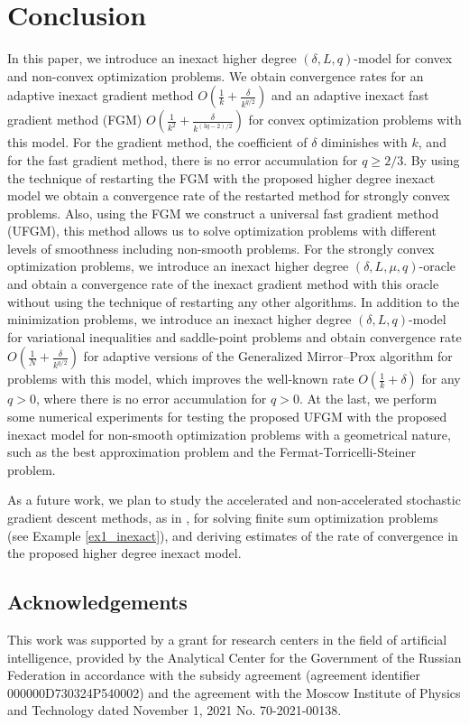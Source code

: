 \documentclass[11pt]{amsart}
\theoremstyle{definition}
\numberwithin{equation}{section}
\begin{document}
\section{Conclusion}\label{sect:Conclusion}
In this paper, we introduce an inexact higher degree $(\delta, L, q)$-model for convex and non-convex optimization problems.  We obtain convergence rates for an adaptive inexact gradient method $O\left(\frac{1}{k} + \frac{\delta}{k^{q/2}}\right)$ and an adaptive inexact fast gradient method (FGM) $O\left(\frac{1}{k^2} + \frac{\delta}{k^{(3q-2)/2}}\right)$ for convex optimization problems with this model.  For the gradient method, the coefficient of $\delta$ diminishes with $k$, and for the fast gradient method, there is no error accumulation for $q \geq 2/3$. By using the technique of restarting the FGM with the proposed higher degree inexact model we obtain a convergence rate of the restarted method for strongly convex problems. Also, using the FGM we construct a universal fast gradient method (UFGM), this method allows us to solve optimization problems with different levels of smoothness including non-smooth problems. For the strongly convex optimization problems, we introduce an inexact higher degree $(\delta, L, \mu, q)$-oracle and obtain a convergence rate of the inexact gradient method with this oracle without using the technique of restarting any other algorithms. In addition to the minimization problems, we introduce an inexact higher degree $(\delta, L, q)$-model for variational inequalities and saddle-point problems and obtain convergence rate $O\left(\frac{1}{N} + \frac{\delta}{k^{q/2}}\right)$ for adaptive versions of the Generalized Mirror–Prox algorithm for problems with this model, which improves the well-known rate $O\left(\frac{1}{k} + \delta\right)$ for any $q > 0 $, where there is no error accumulation for $q > 0$. At the last, we perform some numerical experiments for testing the proposed UFGM with the proposed inexact model for non-smooth optimization problems with a geometrical nature, such as the best approximation problem and the Fermat-Torricelli-Steiner problem.

As a future work, we plan to study the accelerated and non-accelerated stochastic gradient descent methods, as in \cite{Dvinskikh2020Accelerated}, for solving finite sum optimization problems (see Example \ref{ex1_inexact}), and deriving estimates of the rate of convergence in the proposed higher degree inexact model. 

\subsection*{Acknowledgements}
This work was supported by a grant for research centers in the field of artificial intelligence, provided by the Analytical Center for the Government of the Russian Federation in accordance with the subsidy agreement (agreement identifier 000000D730324P540002) and the agreement with the Moscow Institute of Physics and Technology dated November 1, 2021 No. 70-2021-00138.
\end{document}
